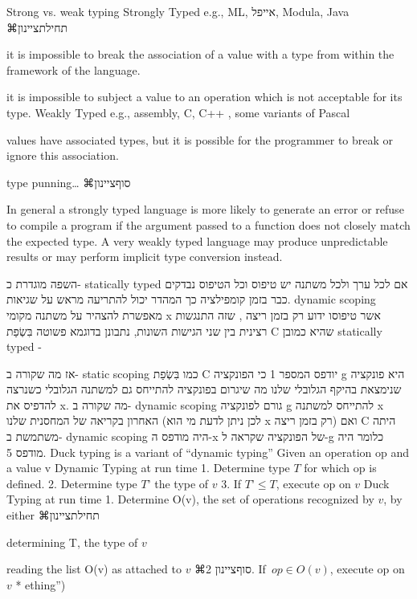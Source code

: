         Strong vs. weak typing
        Strongly Typed e.g., ML, אייפל, Modula, Java
        ⌘תחילת{ציינון}
          \item it is impossible to break the association of a value
          with a type from within the framework of the language.
          \item it is impossible to subject a value to an operation
          which is not acceptable for its type.
          Weakly Typed e.g., assembly, C, C++ , some variants of Pascal
          \item values have associated types, but it is possible for
          the programmer to break or ignore this association.
          \item type punning…
        ⌘סוף{ציינון}

        In general a strongly typed language is more likely to generate an error or refuse to compile a program if the argument passed to a function does not closely match the expected type. A very weakly typed language may produce unpredictable results or may perform implicit type conversion instead.

        השפה מוגדרת כ- statically typed אם לכל ערך ולכל משתנה יש טיפוס וכל הטיפוס נבדקים כבר בזמן קומפילציה כך המהדר יכול להתריעה מראש על שגיאות.
        dynamic scoping מאפשרת להצהיר על משתנה מקומי x אשר טיפוסו ידוע רק בזמן ריצה , שזה התנגשות רצינית בין שני הגישות השונות, נתבונן בדוגמא פשוטה בִּשְׂפַת C שהיא כמובן statically typed -

        אז מה שקורה ב- static scoping כמו בִּשְׂפַת C יודפס המספר 1 כי הפונקציה g היא פונקציה שנימצאת בהיקף הגלובלי שלנו מה שיגרום בפונקציה להתייחס גם למשתנה הגלובלי כשנרצה להדפיס את x.
        מה שקורה ב- dynamic scoping גורם לפונקציה g להתייחס למשתנה x האחרון בקריאה של המחסנית שלנו (לכן ניתן לדעת מי הוא x רק בזמן ריצה) ואם C היתה משתמשת ב- dynamic scoping היה מודפס ה-x של הפונקציה שקראה ל-g כלומר היה מודפס 5.
        Duck typing is a variant of “dynamic typing”
        Given an operation op and a value v
        Dynamic Typing at run time
        1. Determine type $T$ for which op is defined.
        2. Determine type $T’$ the type of $v$
        3. If $T’ ≤ T$, execute op on $v$
        Duck Typing at run time
        1. Determine O(v), the set of operations recognized by $v$, by either
        ⌘תחילת{ציינון}
          \item determining T, the type of $v$
          \item reading the list O(v) as attached to $v$
        ⌘סוף{ציינון}
        2. If~$op∈ O(v)$, execute op on $v$
        * ething”)

